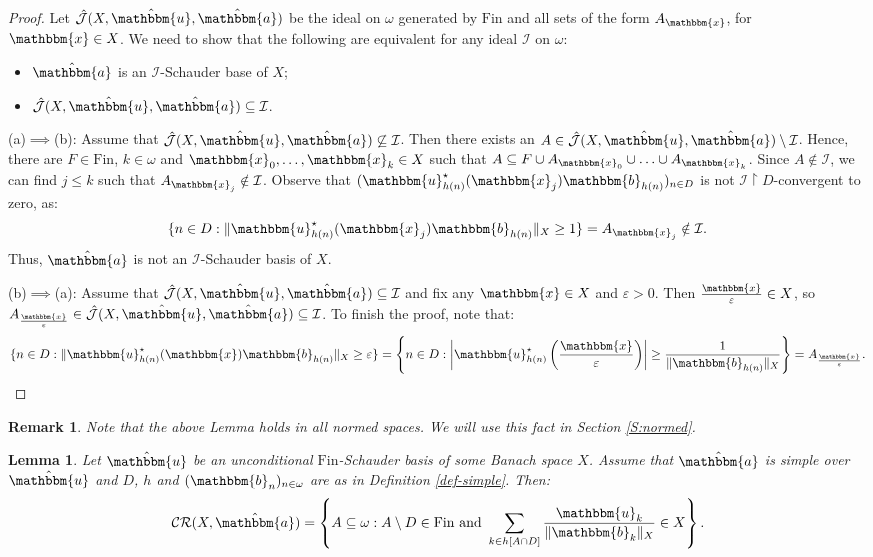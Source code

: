 \documentclass{amsart}
\newcommand{\I}{\mathcal{I}}
\newcommand{\J}{\mathcal{J}}
\newcommand{\Fin}{\mathrm{Fin}}
\newcommand{\CR}{\mathcal{CR}}
\newcommand{\w}{\mathbbm}
\newtheorem{lemma}[theorem]{Lemma}
\newtheorem{remark}[theorem]{Remark}
\begin{document}
\begin{proof}
Let $\hat{\J}(X,\hat{\w{u}},\hat{\w{a}})$ be the ideal on $\omega$ generated by $\Fin$ and all sets of the form $A_{\w{x}}$, for $\w{x}\in X$. We need to show that the following are equivalent for any ideal $\I$ on $\omega$:
\begin{itemize}
    \item[(a)] $\hat{\w{a}}$ is an $\I$-Schauder base of $X$;
    \item[(b)] $\hat{\J}(X,\hat{\w{u}},\hat{\w{a}})\subseteq\I$.
\end{itemize}

(a)$\implies$(b): Assume that $\hat{\J}(X,\hat{\w{u}},\hat{\w{a}})\not\subseteq\I$. Then there exists an $A\in\hat{\J}(X,\hat{\w{u}},\hat{\w{a}})\setminus\I$. Hence, there are $F\in\Fin$, $k\in\omega$ and $\w{x}_0,\ldots,\w{x}_k\in X$ such that $A\subseteq F\cup A_{\w{x}_0}\cup\ldots\cup A_{\w{x}_k}$. Since $A\notin\I$, we can find $j\leq k$ such that $A_{\w{x}_j}\notin\I$. Observe that $(\w{u}_{h(n)}^\star(\w{x}_j)\w{b}_{h(n)})_{n\in D}$ is not $\I\restriction D$-convergent to zero, as:
\[
\{n\in D: \|\w{u}_{h(n)}^\star(\w{x}_j)\w{b}_{h(n)}\|_X\geq 1\}=A_{\w{x}_j}\notin\I.
\]
Thus, $\hat{\w{a}}$ is not an $\I$-Schauder basis of $X$. 

(b)$\implies$(a): Assume that $\hat{\J}(X,\hat{\w{u}},\hat{\w{a}})\subseteq\I$ and fix any $\w{x}\in X$ and $\varepsilon>0$. Then $\frac{\w{x}}{\varepsilon}\in X$, so $A_{\frac{\w{x}}{\varepsilon}}\in\hat{\J}(X,\hat{\w{u}},\hat{\w{a}})\subseteq\I$. To finish the proof, note that:
\[
\{n\in D: \|\w{u}_{h(n)}^\star(\w{x})\w{b}_{h(n)}\|_X\geq \varepsilon\}=\left\{n\in D: \left|\w{u}_{h(n)}^\star\left(\frac{\w{x}}{\varepsilon}\right)\right|\geq \frac{1}{\|\w{b}_{h(n)}\|_X}\right\}=A_{\frac{\w{x}}{\varepsilon}}.
\]
\end{proof}

\begin{remark}
\label{remark-general-lem1}
Note that the above Lemma holds in all normed spaces. We will use this fact in Section \ref{S:normed}.
\end{remark}

\begin{lemma}
\label{general-lem2}
Let $\hat{\w{u}}$ be an unconditional $\Fin$-Schauder basis of some Banach space $X$. Assume that $\hat{\w{a}}$ is simple over $\hat{\w{u}}$ and $D$, $h$ and $(\w{b}_n)_{n\in\omega}$ are as in Definition \ref{def-simple}. Then:
\[
\CR(X,\hat{\w{a}})=\left\{A\subseteq\omega: A\setminus D\in\Fin\text{ and }\sum_{k\in h[A\cap D]}\frac{\w{u}_{k}}{\|\w{b}_{k}\|_X}\in X\right\}.
\]
\end{lemma}
\end{document}
